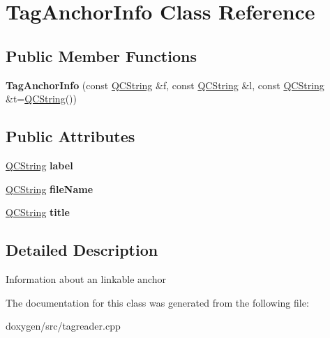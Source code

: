 \hypertarget{class_tag_anchor_info}{}\section{Tag\+Anchor\+Info Class Reference}
\label{class_tag_anchor_info}
\subsection*{Public Member Functions}
\begin{DoxyCompactItemize}
\item 
\mbox{\label{class_tag_anchor_info_aba42283529253b4f739e411b335ee156}} 
{\bfseries Tag\+Anchor\+Info} (const \mbox{\hyperlink{class_q_c_string}{Q\+C\+String}} \&f, const \mbox{\hyperlink{class_q_c_string}{Q\+C\+String}} \&l, const \mbox{\hyperlink{class_q_c_string}{Q\+C\+String}} \&t=\mbox{\hyperlink{class_q_c_string}{Q\+C\+String}}())
\end{DoxyCompactItemize}
\subsection*{Public Attributes}
\begin{DoxyCompactItemize}
\item 
\mbox{\label{class_tag_anchor_info_af21f6c7bc90c6e891896f4f9729903a0}} 
\mbox{\hyperlink{class_q_c_string}{Q\+C\+String}} {\bfseries label}
\item 
\mbox{\label{class_tag_anchor_info_a1a74ea88349151a92b1016917f1a0861}} 
\mbox{\hyperlink{class_q_c_string}{Q\+C\+String}} {\bfseries file\+Name}
\item 
\mbox{\label{class_tag_anchor_info_a62f01240651361a71edb6e18d65c2c87}} 
\mbox{\hyperlink{class_q_c_string}{Q\+C\+String}} {\bfseries title}
\end{DoxyCompactItemize}


\subsection{Detailed Description}
Information about an linkable anchor 

The documentation for this class was generated from the following file\+:\begin{DoxyCompactItemize}
\item 
doxygen/src/tagreader.\+cpp\end{DoxyCompactItemize}
